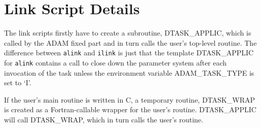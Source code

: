 \documentclass[twoside,11pt,nolof]{starlink}
\begin{document}
\newpage
\section{\label{link_det}Link Script Details}
The link scripts firstly have to create a subroutine, DTASK\_APPLIC, which is
called by the ADAM fixed part and in turn calls the user's top-level
routine.
The difference between \texttt{alink} and \texttt{ilink} is just that the
template DTASK\_APPLIC for \texttt{alink} contains a call to close down the
parameter system after each invocation of the task unless the environment
variable ADAM\_TASK\_TYPE is set to `I'.

If the user's main routine is written in C, a temporary routine,
DTASK\_WRAP is created as a Fortran-callable wrapper for the user's
routine. DTASK\_APPLIC will call DTASK\_WRAP, which in turn calls the user's
routine.
\end{document}

